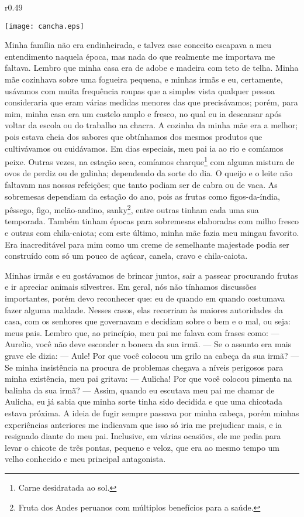 \ifdefined\EnableIncludeImages
\begin{wrapfigure}{r}{0.49\textwidth}
  \begin{center}
  \vspace{-20pt}
    \texttt{[image: cancha.eps]}
  \end{center}
  \vspace{-20pt}
\end{wrapfigure}
\fi
Minha família não era endinheirada, e talvez esse conceito escapava a meu entendimento naquela época, mas nada do que realmente me importava me faltava.
Lembro que minha casa era de adobe e madeira com teto de telha. Minha mãe cozinhava sobre uma fogueira pequena, e minhas irmãs e eu, certamente, usávamos com muita frequência roupas que a simples vista qualquer pessoa consideraria que eram várias medidas menores das que precisávamos;
porém, para mim, minha casa era um castelo amplo e fresco, no qual eu ia descansar após voltar da escola ou do trabalho na chacra. 
A cozinha da minha mãe era a melhor; pois estava cheia dos sabores que obtínhamos dos mesmos produtos que cultivávamos ou cuidávamos. 
Em dias especiais, meu pai ia ao rio e comíamos peixe. Outras vezes, na estação seca, comíamos charque\footnote{Carne desidratada ao sol.} com alguma mistura de ovos de perdiz ou de galinha; dependendo da sorte do dia.
O queijo e o leite não faltavam nas nossas refeições; que tanto podiam ser de cabra ou de vaca.
As sobremesas dependiam da estação do ano, pois as frutas como figos-da-índia, pêssego, figo, melão-andino, sanky\footnote{Fruta dos Andes peruanos com múltiplos benefícios para a saúde.}, entre outras tinham cada uma sua temporada. Também tinham épocas para sobremesas elaboradas com milho fresco e outras com chila-caiota; com este último, minha mãe fazia meu mingau favorito. Era inacreditável para mim como um creme de semelhante majestade podia ser construído com só um pouco de açúcar, canela, cravo e chila-caiota.

Minhas irmãs e eu gostávamos de brincar juntos, sair a passear procurando frutas e ir apreciar animais silvestres. Em geral, nós não tínhamos discussões importantes, porém devo reconhecer que: eu de quando em quando costumava fazer alguma maldade.
Nesses casos, elas recorriam às maiores autoridades da casa, com os senhores que governavam e decidiam sobre o bem e o mal, ou seja: meus pais. 
Lembro que, ao princípio, meu pai me falava com frases como: 
--- Aurelio, você não deve esconder a boneca da sua irmã. --- 
Se o assunto era mais grave ele dizia: 
--- Aule! Por que você colocou um grilo na cabeça da sua irmã? --- 
Se minha insistência na procura de problemas chegava a níveis perigosos para minha existência, meu pai gritava: 
--- Aulicha! Por que você colocou pimenta na balinha da sua irmã? ---
Assim, quando eu escutava meu pai me chamar de Aulicha, eu já sabia que minha sorte tinha sido decidida e que uma chicotada estava próxima. A ideia de fugir sempre passava por minha cabeça, porém minhas experiências anteriores me indicavam que isso só iria me prejudicar mais, e ia resignado diante do meu pai. Inclusive, em várias ocasiões, ele me pedia para levar o chicote de três pontas, pequeno e veloz, que era ao mesmo tempo um velho conhecido e meu principal antagonista.

